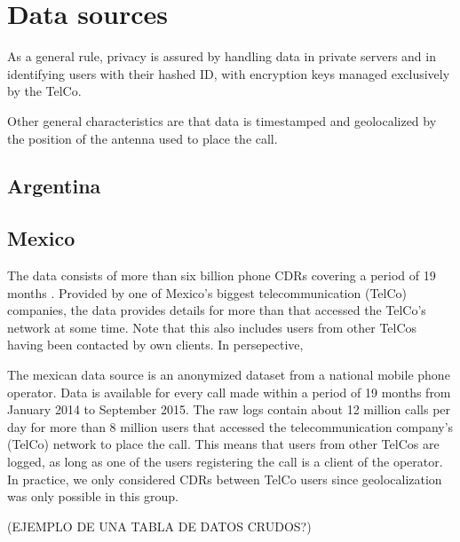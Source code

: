 \section{Data sources}

As a general rule, privacy is assured by handling data in private servers and in identifying users with their hashed ID, with encryption keys managed exclusively by the TelCo.

Other general characteristics are that data is timestamped and geolocalized by the position of the antenna used to place the call.

\subsection{Argentina}

\subsection{Mexico}

The data consists of more than six billion phone CDRs covering a period of 19 months . Provided by one of Mexico's biggest telecommunication (TelCo) companies, the data provides details for more than  that accessed the TelCo's network at some time. Note that this also includes users from other TelCos having been contacted by own clients. In persepective, 

The mexican data source is an anonymized dataset from a national mobile phone operator. Data is available for every call made within a period of 19 months from January 2014 to September 2015. The raw logs contain about 12 million calls per day for more than 8 million users that accessed the telecommunication company's (TelCo) network to place the call. This means that users from other TelCos are logged, as long as one of the users registering the call is a client of the operator. In practice, we only considered CDRs between TelCo users since geolocalization was only possible in this group.

(EJEMPLO DE UNA TABLA DE DATOS CRUDOS?)


